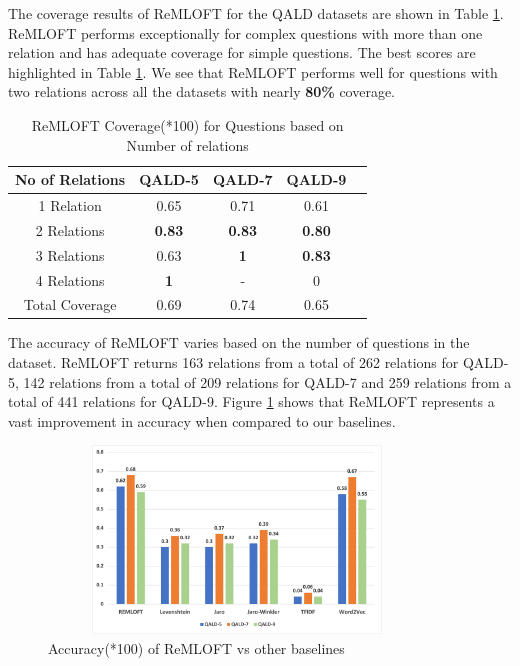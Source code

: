 The coverage results of ReMLOFT for the QALD datasets are shown in Table \ref{tab:relationcoverage}. ReMLOFT performs exceptionally for complex questions with more than one relation and has adequate coverage for simple questions. The best scores are highlighted in Table \ref{tab:relationcoverage}. We see that ReMLOFT performs well for questions with two relations across all the datasets with nearly \textbf{80\%} coverage. 
\begin{table}[H]
    \centering
    \begin{tabular}{|c|c|c|c|c|}
     \hline
     \textbf{No of Relations} & \textbf{QALD-5} & \textbf{QALD-7} & \textbf{QALD-9}  \\
    \hline
     1 Relation & 0.65 & 0.71	& 0.61 \\
    \hline
    2 Relations & \textbf{0.83} & \textbf{0.83} & \textbf{0.80} \\
    \hline
    3 Relations & 0.63 & \textbf{1}	& \textbf{0.83} \\
    \hline
    4 Relations & \textbf{1} & - & 0 \\
    \hline
        Total Coverage & 0.69 & 0.74 & 0.65 \\
            \hline
    \end{tabular}
    \caption{ReMLOFT Coverage(*100) for Questions based on Number of relations}
    \label{tab:relationcoverage}
\end{table}

The accuracy of ReMLOFT varies based on the number of questions in the dataset. ReMLOFT returns 163 relations from a total of 262 relations for QALD-5, 142 relations from a total of 209 relations for QALD-7 and 259 relations from a total of 441 relations for QALD-9. Figure \ref{fig:graphacc} shows that ReMLOFT represents a vast improvement in accuracy when compared to our baselines.

\begin{figure}
    \centering
   \includegraphics[width=10cm, height=5cm]{chapters/figures/Accuracy.png}
    \caption{Accuracy(*100) of ReMLOFT vs other baselines}
    \label{fig:graphacc}
\end{figure}

